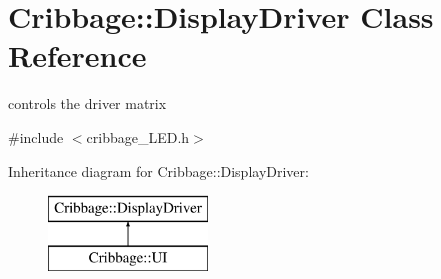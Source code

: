 \hypertarget{class_cribbage_1_1_display_driver}{}\section{Cribbage\+:\+:Display\+Driver Class Reference}
\label{class_cribbage_1_1_display_driver}


controls the driver matrix  




{\ttfamily \#include $<$cribbage\+\_\+\+L\+E\+D.\+h$>$}

Inheritance diagram for Cribbage\+:\+:Display\+Driver\+:\begin{figure}[H]
\begin{center}
\leavevmode
\includegraphics[height=2.000000cm]{class_cribbage_1_1_display_driver}
\end{center}
\end{figure}
